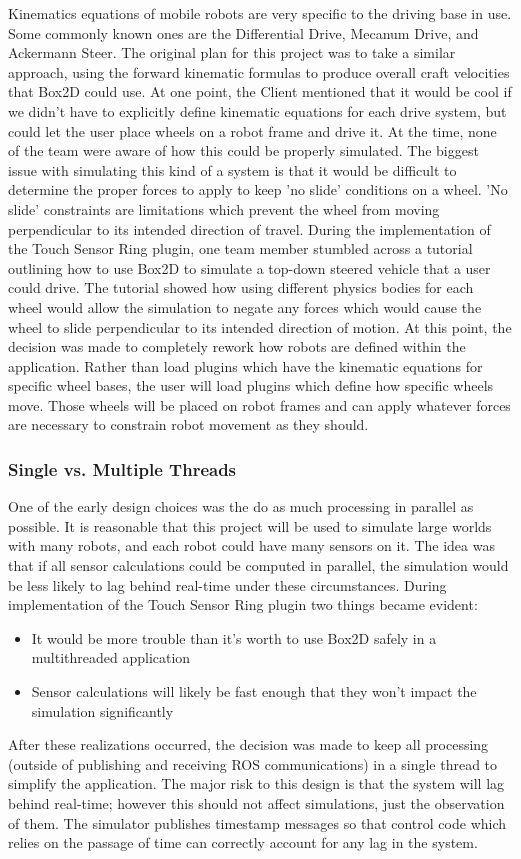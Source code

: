 	Kinematics equations of mobile robots are very specific to the driving base in use. Some commonly known ones are the Differential Drive, Mecanum Drive, and Ackermann Steer.
	The original plan for this project was to take a similar approach, using the forward kinematic formulas to produce overall craft velocities that Box2D could use. At one point, the Client mentioned that it would be cool if we didn't have to explicitly define kinematic equations for each drive system, but could let the user place wheels on a robot frame and drive it. At the time, none of the team were aware of how this could be properly simulated. The biggest issue with simulating this kind of a system is that it would be difficult to determine the proper forces to apply to keep 'no slide' conditions on a wheel. 'No slide' constraints are limitations which prevent the wheel from moving perpendicular to its intended direction of travel.
	During the implementation of the Touch Sensor Ring plugin, one team member stumbled across a tutorial outlining how to use Box2D to simulate a top-down steered vehicle that a user could drive. The tutorial showed how using different physics bodies for each wheel would allow the simulation to negate any forces which would cause the wheel to slide perpendicular to its intended direction of motion. 
	At this point, the decision was made to completely rework how robots are defined within the application. Rather than load plugins which have the kinematic equations for specific wheel bases, the user will load plugins which define how specific wheels move. Those wheels will be placed on robot frames and can apply whatever forces are necessary to constrain robot movement as they should.
	
	\subsubsection*{Single vs. Multiple Threads}
	One of the early design choices was the do as much processing in parallel as possible. It is reasonable that this project will be used to simulate large worlds with many robots, and each robot could have many sensors on it. The idea was that if all sensor calculations could be computed in parallel, the simulation would be less likely to lag behind real-time under these circumstances.
	During implementation of the Touch Sensor Ring plugin two things became evident:
	\begin{itemize}
		\item It would be more trouble than it's worth to use Box2D safely in a multithreaded application
		\item Sensor calculations will likely be fast enough that they won't impact the simulation significantly
	\end{itemize}
	After these realizations occurred, the decision was made to keep all processing (outside of publishing and receiving ROS communications) in a single thread to simplify the application. The major risk to this design is that the system will lag behind real-time; however this should not affect simulations, just the observation of them. The simulator publishes timestamp messages so that control code which relies on the passage of time can correctly account for any lag in the system.

